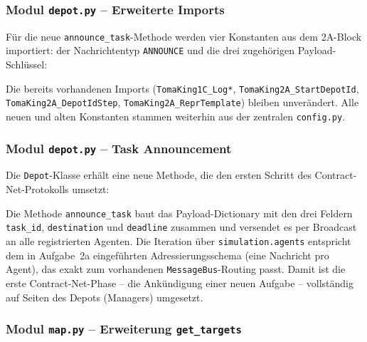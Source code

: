 
\subsubsection{Modul \texttt{depot.py} – Erweiterte Imports}

Für die neue \texttt{announce\_task}-Methode werden vier Konstanten aus dem 2A-Block importiert: der Nachrichtentyp \texttt{ANNOUNCE} und die drei zugehörigen Payload-Schlüssel:



Die bereits vorhandenen Imports (\texttt{TomaKing1C\_Log*}, \texttt{TomaKing2A\_StartDepotId}, \texttt{TomaKing2A\_DepotIdStep}, \texttt{TomaKing2A\_ReprTemplate}) bleiben unverändert. Alle neuen und alten Konstanten stammen weiterhin aus der zentralen \texttt{config.py}.


\subsubsection{Modul \texttt{depot.py} – Task Announcement}

Die \texttt{Depot}-Klasse erhält eine neue Methode, die den ersten Schritt des Contract-Net-Protokolls umsetzt:



Die Methode \texttt{announce\_task} baut das Payload-Dictionary mit den drei Feldern \texttt{task\_id}, \texttt{destination} und \texttt{deadline} zusammen und versendet es per Broadcast an alle registrierten Agenten. Die Iteration über \texttt{simulation.agents} entspricht dem in Aufgabe~2a eingeführten Adressierungsschema (eine Nachricht pro Agent), das exakt zum vorhandenen \texttt{MessageBus}-Routing passt. Damit ist die erste Contract-Net-Phase -- die Ankündigung einer neuen Aufgabe -- vollständig auf Seiten des Depots (Managers) umgesetzt.


\subsubsection{Modul \texttt{map.py} – Erweiterung \texttt{get\_targets}}


